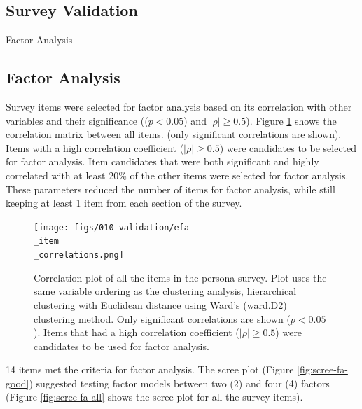 \documentclass[020-persona\_validation.tex]{subfiles}
\begin{document}
    \subsection{Survey Validation}
    
        Factor Analysis  

    \subsection{Factor Analysis}

        Survey items were selected for factor analysis based on its correlation with other variables and their significance
        (($p < 0.05$) and $\left|\rho\right| \ge 0.5$).
        Figure \ref{fig:persona-item-corr} shows the correlation matrix between all items.
        (only significant correlations are shown).
        Items with a high correlation coefficient ($\left|\rho\right| \ge 0.5$) were candidates to be selected for factor analysis.
        Item candidates that were both significant and highly correlated with at least 20\% of the other items were
        selected for factor analysis.
        These parameters reduced the number of items for factor analysis,
        while still keeping at least 1 item from each section of the survey.

        \begin{figure}[htb]
            \centering
            \texttt{[image: figs/010-validation/efa\\\_item\\\_correlations.png]}
            \caption[Correlation matrix of persona items]
            {Correlation plot of all the items in the persona survey.
             Plot uses the same variable ordering as the clustering analysis,
             hierarchical clustering with Euclidean distance using Ward's (ward.D2) clustering method.
             Only significant correlations are shown ($p < 0.05$).
             Items that had a high correlation coefficient ($\left|\rho\right| \ge 0.5$)
             were candidates to be used for factor analysis.
            }
            \label{fig:persona-item-corr}
        \end{figure}

        14 items met the criteria for factor analysis.
        The scree plot (Figure \ref{fig:scree-fa-good}) suggested testing factor models between two (2) and four (4) factors
        (Figure \ref{fig:scree-fa-all} shows the scree plot for all the survey items).
\end{document}
